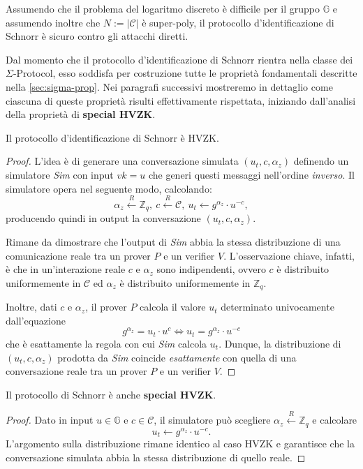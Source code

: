 \begin{theorem}
	Assumendo che il problema del logaritmo discreto è difficile per il gruppo $\mathbb{G}$ e assumendo inoltre che $N := |\mathcal{C}|$ è super-poly, il protocollo d'identificazione di Schnorr è sicuro contro gli attacchi diretti.
\end{theorem}

Dal momento che il protocollo d'identificazione di Schnorr rientra nella classe dei $\Sigma$-Protocol, esso soddisfa per costruzione tutte le proprietà fondamentali descritte nella \autoref{sec:sigma-prop}. Nei paragrafi successivi mostreremo in dettaglio come ciascuna di queste proprietà risulti effettivamente rispettata, iniziando dall’analisi della proprietà di \textbf{special HVZK}.

\begin{theorem}\label{thm:schnorr-hvzk}
	Il protocollo d'identificazione di Schnorr è HVZK.
	\begin{proof}
		L'idea è di generare una conversazione simulata $(u_t, c, \alpha_z)$ definendo un simulatore \textit{Sim} con input $vk = u$ che generi questi messaggi nell'ordine \textit{inverso}. Il simulatore opera nel seguente modo, calcolando:
		\[
			\alpha_z \overset{R}{\leftarrow} \mathbb{Z}_q,\ c \overset{R}{\leftarrow} \mathcal{C},\ u_t \leftarrow g^{\alpha_z}\cdot u^{-c},
		\]
		producendo quindi in output la conversazione $(u_t, c, \alpha_z)$.
		        
		Rimane da dimostrare che l'output di \textit{Sim} abbia la stessa distribuzione di una comunicazione reale tra un prover $P$ e un verifier $V$. L'osservazione chiave, infatti, è che in un'interazione reale $c$ e $\alpha_z$ sono indipendenti, ovvero $c$ è distribuito uniformemente in $\mathcal{C}$ ed $\alpha_z$ è distribuito  uniformemente in $\mathbb{Z}_q$.
		        
		Inoltre, dati $c$ e $\alpha_z$, il prover $P$ calcola il valore $u_t$ determinato univocamente dall'equazione 
		\[
			g^{\alpha_z} = u_t \cdot u^c \Longleftrightarrow u_t = g^{\alpha_z}\cdot u^{-c}
		\]
		che è esattamente la regola con cui \textit{Sim} calcola $u_t$. Dunque, la distribuzione di $(u_t, c, \alpha_z)$ prodotta da \textit{Sim} coincide \textit{esattamente} con quella di una conversazione reale tra un prover $P$ e un verifier $V$. 
	\end{proof}
\end{theorem}


\begin{proposition}
	Il protocollo di Schnorr è anche \textbf{special HVZK}.
	\begin{proof}
		Dato in input $u \in \mathbb{G}$ e $c \in \mathcal{C}$, il simulatore può
		scegliere $\alpha_z \overset{R}{\leftarrow} \mathbb{Z}_q$ e calcolare
		\[
			u_t \leftarrow g^{\alpha_z} \cdot u^{-c}.
		\]
		L’argomento sulla distribuzione rimane identico al caso HVZK e garantisce
		che la conversazione simulata abbia la stessa distribuzione di quello reale.
	\end{proof}
\end{proposition}

